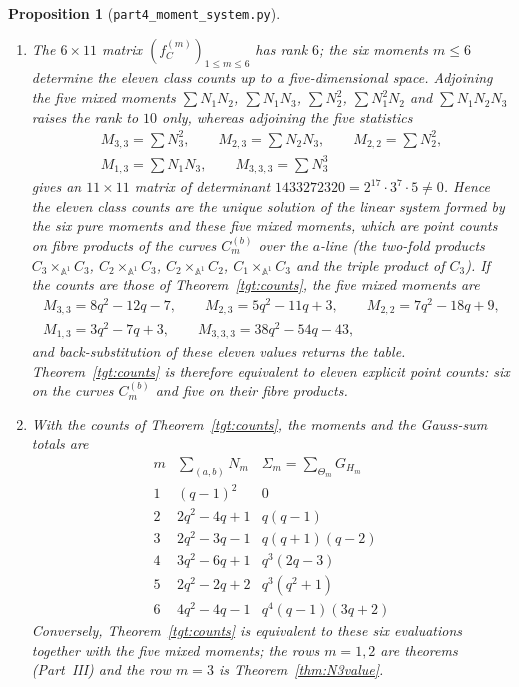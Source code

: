 \documentclass[12pt,a4paper]{amsart}
\newtheorem{proposition}[theorem]{Proposition}
\theoremstyle{definition}
\begin{document}
\begin{proposition}[\texttt{part4\_moment\_system.py}]\label{prop:elimination}
\begin{enumerate}[label=\textup{(\roman*)},leftmargin=2em]
\item The $6\times11$ matrix $(f^{(m)}_C)_{1\le m\le6}$ has rank $6$; the six moments $m\le6$ determine the eleven class counts up to a five-dimensional space. Adjoining the five mixed moments $\sum N_1N_2$, $\sum N_1N_3$, $\sum N_2^2$, $\sum N_1^2N_2$ and $\sum N_1N_2N_3$ raises the rank to $10$ only, whereas adjoining the five statistics
\begin{gather*}
M_{3,3}=\sum N_3^2,\qquad M_{2,3}=\sum N_2N_3,\qquad M_{2,2}=\sum N_2^2,\\
M_{1,3}=\sum N_1N_3,\qquad M_{3,3,3}=\sum N_3^3
\end{gather*}
gives an $11\times11$ matrix of determinant $1433272320=2^{17}\cdot3^7\cdot5\ne0$. Hence the eleven class counts are the unique solution of the linear system formed by the six pure moments and these five mixed moments, which are point counts on fibre products of the curves $C_m^{(b)}$ over the $a$-line (the two-fold products $C_3\times_{\mathbb A^1}C_3$, $C_2\times_{\mathbb A^1}C_3$, $C_2\times_{\mathbb A^1}C_2$, $C_1\times_{\mathbb A^1}C_3$ and the triple product of $C_3$). If the counts are those of Theorem~\ref{tgt:counts}, the five mixed moments are
\begin{gather*}
M_{3,3}=8q^2-12q-7,\qquad M_{2,3}=5q^2-11q+3,\qquad M_{2,2}=7q^2-18q+9,\\
M_{1,3}=3q^2-7q+3,\qquad M_{3,3,3}=38q^2-54q-43 ,
\end{gather*}
and back-substitution of these eleven values returns the table. Theorem~\ref{tgt:counts} is therefore equivalent to eleven explicit point counts: six on the curves $C_m^{(b)}$ and five on their fibre products.
\item With the counts of Theorem~\ref{tgt:counts}, the moments and the Gauss-sum totals are
\[
\begin{array}{c|l|l}
m & \sum_{(a,b)}N_m & \Sigma_m=\sum_{\Theta_m}G_{H_m}\\
\hline
1 & (q-1)^2 & 0\\
2 & 2q^2-4q+1 & q(q-1)\\
3 & 2q^2-3q-1 & q(q+1)(q-2)\\
4 & 3q^2-6q+1 & q^3(2q-3)\\
5 & 2q^2-2q+2 & q^3(q^2+1)\\
6 & 4q^2-4q-1 & q^4(q-1)(3q+2)
\end{array}
\]
Conversely, Theorem~\ref{tgt:counts} is equivalent to these six evaluations together with the five mixed moments; the rows $m=1,2$ are theorems (Part~III) and the row $m=3$ is Theorem~\ref{thm:N3value}.
\end{enumerate}
\end{proposition}
\end{document}

